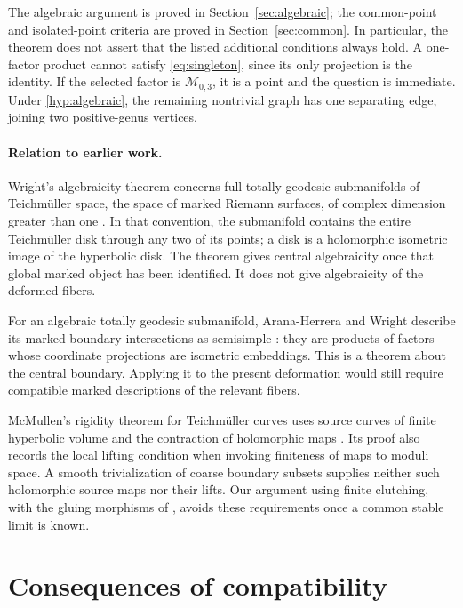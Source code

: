 \documentclass[11pt]{article}
\newcommand{\M}{\mathcal M}
\theoremstyle{definition}
\theoremstyle{remark}
\begin{document}
The algebraic argument is proved in Section~\ref{sec:algebraic}; the common-point and isolated-point criteria are proved in Section~\ref{sec:common}. In particular, the theorem does not assert that the listed additional conditions always hold. A one-factor product cannot satisfy \eqref{eq:singleton}, since its only projection is the identity. If the selected factor is $\M_{0,3}$, it is a point and the question is immediate. Under \eqref{hyp:algebraic}, the remaining nontrivial graph has one separating edge, joining two positive-genus vertices.

\paragraph{Relation to earlier work.}
Wright's algebraicity theorem concerns full totally geodesic submanifolds of Teichm\"uller space, the space of marked Riemann surfaces, of complex dimension greater than one \cite[Theorem~1.1]{Wright}. In that convention, the submanifold contains the entire Teichm\"uller disk through any two of its points; a disk is a holomorphic isometric image of the hyperbolic disk. The theorem gives central algebraicity once that global marked object has been identified. It does not give algebraicity of the deformed fibers.

For an algebraic totally geodesic submanifold, Arana-Herrera and Wright describe its marked boundary intersections as semisimple \cite[Theorem~1.3]{AW}: they are products of factors whose coordinate projections are isometric embeddings. This is a theorem about the central boundary. Applying it to the present deformation would still require compatible marked descriptions of the relevant fibers.

McMullen's rigidity theorem for Teichm\"uller curves uses source curves of finite hyperbolic volume and the contraction of holomorphic maps \cite[Theorem~1 and its proof]{McMullen}. Its proof also records the local lifting condition when invoking finiteness of maps to moduli space. A smooth trivialization of coarse boundary subsets supplies neither such holomorphic source maps nor their lifts. Our argument using finite clutching, with the gluing morphisms of \cite[Definition~4.1 and Proposition~4.4]{EF}, avoids these requirements once a common stable limit is known.

\section{Consequences of compatibility}\label{sec:compat}
\end{document}
